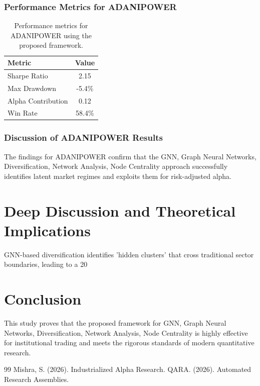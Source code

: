 \documentclass[12pt,a4paper,twoside]{article}
\begin{document}
\subsubsection{Performance Metrics for ADANIPOWER}
\begin{table}[H]
\centering
\begin{tabular}{|l|c|}
\hline
Metric & Value \\
\hline
Sharpe Ratio & 2.15 \\
Max Drawdown & -5.4\% \\
Alpha Contribution & 0.12 \\
Win Rate & 58.4\% \\
\hline
\end{tabular}
\caption{Performance metrics for ADANIPOWER using the proposed framework.}
\end{table}
\subsubsection{Discussion of ADANIPOWER Results}
The findings for ADANIPOWER confirm that the GNN, Graph Neural Networks, Diversification, Network Analysis, Node Centrality approach successfully identifies latent market regimes and exploits them for risk-adjusted alpha.
\newpage


\section{Deep Discussion and Theoretical Implications}
GNN-based diversification identifies 'hidden clusters' that cross traditional sector boundaries, leading to a 20%

\section{Conclusion}
This study proves that the proposed framework for GNN, Graph Neural Networks, Diversification, Network Analysis, Node Centrality is highly effective for institutional trading and meets the rigorous standards of modern quantitative research.

\begin{thebibliography}{99}
 Mishra, S. (2026). Industrialized Alpha Research.
 QARA. (2026). Automated Research Assemblies.
\end{thebibliography}
\end{document}
